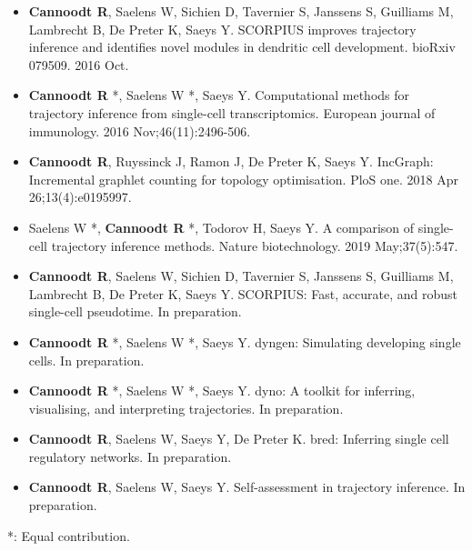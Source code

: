 \begin{itemize}
	\item \textbf{Cannoodt R}, Saelens W, Sichien D, Tavernier S, Janssens S, Guilliams M, Lambrecht B, De Preter K, Saeys Y. SCORPIUS improves trajectory inference and identifies novel modules in dendritic cell development. bioRxiv 079509. 2016 Oct.
	\item \textbf{Cannoodt R} *, Saelens W *, Saeys Y. Computational methods for trajectory inference from single-cell transcriptomics. European journal of immunology. 2016 Nov;46(11):2496-506.
	\item \textbf{Cannoodt R}, Ruyssinck J, Ramon J, De Preter K, Saeys Y. IncGraph: Incremental graphlet counting for topology optimisation. PloS one. 2018 Apr 26;13(4):e0195997.
	\item Saelens W *, \textbf{Cannoodt R} *, Todorov H, Saeys Y. A comparison of single-cell trajectory inference methods. Nature biotechnology. 2019 May;37(5):547.
	\item \textbf{Cannoodt R}, Saelens W, Sichien D, Tavernier S, Janssens S, Guilliams M, Lambrecht B, De Preter K, Saeys Y. SCORPIUS: Fast, accurate, and robust single-cell pseudotime. In preparation.
	\item \textbf{Cannoodt R} *, Saelens W *, Saeys Y. dyngen: Simulating developing single cells. In preparation.
	\item \textbf{Cannoodt R} *, Saelens W *, Saeys Y. dyno: A toolkit for inferring, visualising, and interpreting trajectories. In preparation.
	\item \textbf{Cannoodt R}, Saelens W, Saeys Y, De Preter K. bred: Inferring single cell regulatory networks. In preparation. 
	\item \textbf{Cannoodt R}, Saelens W, Saeys Y. Self-assessment in trajectory inference. In preparation.
\end{itemize}

*: Equal contribution.

